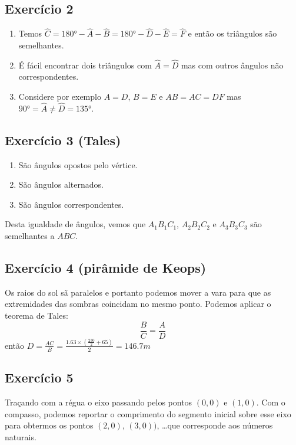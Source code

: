 \subsection*{Exercício 2}

\begin{enumerate}
\item Temos
  $\widehat{C} = {180° - \widehat{A} - \widehat{B}} =
  {180° - \widehat{D} - \widehat{E}} = \widehat{F}$ e então
  os triângulos são semelhantes.
\item É fácil encontrar dois triângulos com $\widehat{A} = \widehat{D}$
  mas com outros ângulos não correspondentes.
\item Considere por exemplo $A = D$, $B = E$ e $AB = AC = DF$ mas
  $90° = \widehat{A} \neq \widehat{D} = 135°$.
\end{enumerate}

\subsection*{Exercício 3 (Tales)}

\begin{enumerate}
  \item São ângulos opostos pelo vértice.
  \item São ângulos alternados.
  \item São ângulos correspondentes.
\end{enumerate}

Desta igualdade de ângulos, vemos que $A_1B_1C_1$, $A_2B_2C_2$ e
$A_3B_3C_3$ são semelhantes a $ABC$.

\subsection*{Exercício 4 (pirâmide de Keops)}

Os raios do sol sã paralelos e portanto podemos mover a vara para que as
extremidades das sombras coincidam no mesmo ponto. Podemos aplicar o teorema de
Tales:
$$
\frac{B}{C} = \frac{A}{D}
$$
então $D = \frac{A C}{B} = \frac{1.63 \times
  \left(\frac{230}{2}+65\right)}{2} = 146.7m$

\subsection*{Exercício 5}

Traçando com a régua o eixo passando pelos pontos $(0,0)$ e $(1,0)$. Com o
compasso, podemos reportar o comprimento do segmento inicial sobre esse eixo
para obtermos os pontos $(2,0)$, $(3,0))$, \ldots que corresponde aos números
naturais.

